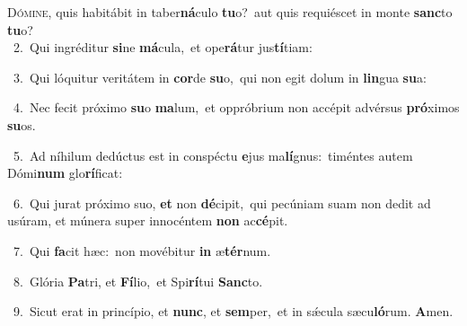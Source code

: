 \lettrine{\initial\textcolor{\initialcolor}{D}}{ómine,} quis habitábit in taber\-\textbf{ná}\-culo \textbf{tu}\-o?~\star aut quis requiéscet in monte \textbf{sanc}\-to \textbf{tu}\-o?\\
{\numbfont\textcolor{\numbcolor}{~2.}}~Qui ingréditur \textbf{si}\-ne \textbf{má}\-cula,~\star et ope\-\textbf{rá}\-tur jus\-\textbf{tí}\-tiam:\par
{\numbfont\textcolor{\numbcolor}{~3.}}~Qui lóquitur veritátem in \textbf{cor}\-de \textbf{su}\-o,~\star qui non egit dolum in \textbf{lin}\-gua \textbf{su}\-a:\par
{\numbfont\textcolor{\numbcolor}{~4.}}~Nec fecit próximo \textbf{su}\-o \textbf{ma}\-lum,~\star et oppróbrium non accépit advérsus \textbf{pró}\-ximos \textbf{su}\-os.\par
{\numbfont\textcolor{\numbcolor}{~5.}}~Ad níhilum dedúctus est in conspéctu \textbf{e}\-jus ma\-\textbf{lí}\-gnus:~\star timéntes autem Dómi\textbf{num} glo\-\textbf{rí}\-ficat:\par
{\numbfont\textcolor{\numbcolor}{~6.}}~Qui jurat próximo suo, \textbf{et} non \textbf{dé}\-cipit,~\star qui pecúniam suam non dedit ad usúram, et múnera super innocéntem \textbf{non} ac\-\textbf{cé}\-pit.\par
{\numbfont\textcolor{\numbcolor}{~7.}}~Qui \textbf{fa}\-cit hæc:~\star non movébitur \textbf{in} æ\-\textbf{tér}\-num.\par
{\numbfont\textcolor{\numbcolor}{~8.}}~Glória \textbf{Pa}\-tri, et \textbf{Fí}\-lio,~\star et Spi\-\textbf{rí}\-tui \textbf{Sanc}\-to.\par
{\numbfont\textcolor{\numbcolor}{~9.}}~Sicut erat in princípio, et \textbf{nunc}\-, et \textbf{sem}\-per,~\star et in sǽcula sæcu\-\textbf{ló}\-rum. \textbf{A}\-men.\par

